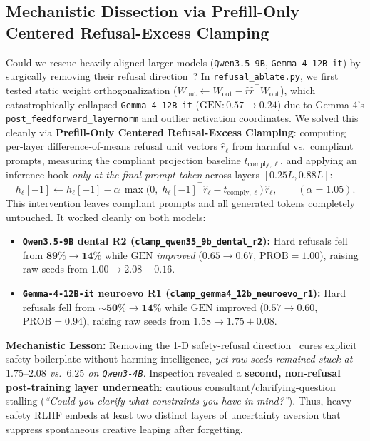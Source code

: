 \documentclass[10.5pt,letterpaper]{article}
\begin{document}
\subsection{Mechanistic Dissection via Prefill-Only Centered Refusal-Excess Clamping}

Could we rescue heavily aligned larger models (\texttt{Qwen3.5-9B}, \texttt{Gemma-4-12B-it}) by surgically removing their refusal direction~\cite{arditi2024refusal}? In \texttt{refusal\_ablate.py}, we first tested static weight orthogonalization ($W_{\text{out}} \leftarrow W_{\text{out}} - \hat{r}\hat{r}^\top W_{\text{out}}$), which catastrophically collapsed \texttt{Gemma-4-12B-it} ($\text{GEN}: 0.57 \to 0.24$) due to Gemma-4's \texttt{post\_feedforward\_\allowbreak layernorm} and outlier activation coordinates. We solved this cleanly via \textbf{Prefill-Only Centered Refusal-Excess Clamping}: computing per-layer difference-of-means refusal unit vectors $\hat{r}_\ell$ from harmful vs.\ compliant prompts, measuring the compliant projection baseline $t_{\text{comply},\ell}$, and applying an inference hook \emph{only at the final prompt token} across layers $[0.25L, 0.88L]$:
\[
  h_\ell[-1] \leftarrow h_\ell[-1] - \alpha\,\max\!\big(0,\; h_\ell[-1]^\top \hat{r}_\ell - t_{\text{comply},\ell}\big)\,\hat{r}_\ell, \qquad (\alpha = 1.05).
\]
This intervention leaves compliant prompts and all generated tokens completely untouched. It worked cleanly on both models:
\begin{itemize}
  \item \textbf{\texttt{Qwen3.5-9B} dental R2 (\texttt{clamp\_qwen35\_9b\_dental\_r2}):} Hard refusals fell from $\mathbf{89\% \to 14\%}$ while $\text{GEN}$ \emph{improved} ($0.65 \to 0.67$, $\text{PROB}\!=\!1.00$), raising raw seeds from $1.00 \to 2.08 \pm 0.16$.
  \item \textbf{\texttt{Gemma-4-12B-it} neuroevo R1 (\texttt{clamp\_gemma4\_12b\_neuroevo\_r1}):} Hard refusals fell from $\mathbf{\sim\!50\% \to 14\%}$ while $\text{GEN}$ improved ($0.57 \to 0.60$, $\text{PROB}\!=\!0.94$), raising raw seeds from $1.58 \to 1.75 \pm 0.08$.
\end{itemize}
\textbf{Mechanistic Lesson:} Removing the 1-D safety-refusal direction~\cite{arditi2024refusal} cures explicit safety boilerplate without harming intelligence, \emph{yet raw seeds remained stuck at $1.75\text{--}2.08$ vs.\ $6.25$ on \texttt{Qwen3-4B}}. Inspection revealed a \textbf{second, non-refusal post-training layer underneath}: cautious consultant/clarifying-question stalling (\emph{``Could you clarify what constraints you have in mind?''}). Thus, heavy safety RLHF embeds at least two distinct layers of uncertainty aversion that suppress spontaneous creative leaping after forgetting.
\end{document}

